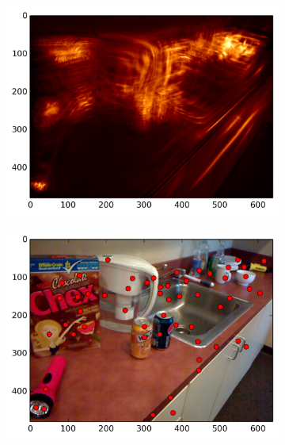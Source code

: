 \begin{figure}[ht]
\begin{subfigure}[]{0.25\linewidth}\label{fig:kit_smag_2}\includegraphics[width=\linewidth]{figures/kitchen_smag_5}\end{subfigure}%
\begin{subfigure}[]{0.25\linewidth}\label{fig:kit_feats_2}\includegraphics[width=\linewidth]{figures/kitchen_feats_5}\end{subfigure}%

\end{figure}
